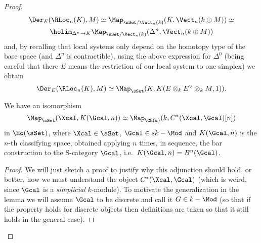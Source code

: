 \begin{proof}
                \begin{gather*}
                    \Der_E(\RLoc_n(K), M) \simeq \Map_{\sSet/\Vect_n(k)}(K, \Vect_n(k \oplus M))\simeq \\ 
                    \holim_{\Delta^n \to K} \Map_{\sSet/\Vect_n(k)}(\Delta^n, \Vect_n(k \oplus M)) 
                \end{gather*}
                and, by recalling that local systems only depend on the homotopy type of the base space (and $\Delta^n$ is contractible), using the above expression for $\Delta^0$ (being careful that there $E$ means the restriction of our local system to one simplex) we obtain \[\Der_E(\RLoc_n(K), M) \simeq \Map_{\sSet}(K, K(E \otimes_k E^{\vee} \otimes_k M, 1)). \] 
                \begin{lemma}
                    \label{lemma:intuition_map_pi0}
                    We have an isomorphism  \[\Map_{\sSet}(\Xcal, K(\Gcal, n)) \simeq \Map_{\Ch(k)}(k, C^*(\Xcal, \Gcal)[n]) \] in $\Ho(\sSet)$, where $\Xcal \in \sSet$, $\Gcal \in sk-\Mod$ and $K(\Gcal, n)$ is the $n$-th classifying space, obtained applying $n$ times, in sequence, the bar construction to the S-category $\Gcal$, i.e.\ $K(\Gcal, n) = B^n(\Gcal)$.
                \end{lemma}
                \begin{proof}
                    We will just sketch a proof to justify why this adjunction should hold, or better, how we must understand the object $C^*(\Xcal, \Gcal)$ (which is weird, since $\Gcal$ is a \emph{simplicial} $k$-module). To motivate the generalization in the lemma we will assume $\Gcal$ to be  discrete and call it $G \in k-\Mod$ (so that if the property holds for discrete objects then definitions are taken so that it still holds in the general case).


\end{proof}
\end{proof}
